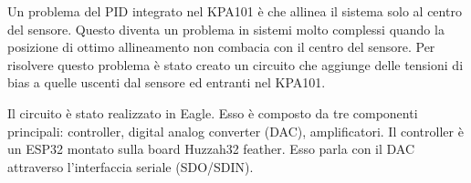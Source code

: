 Un problema del PID integrato nel KPA101 è che allinea il sistema solo al centro del sensore. Questo diventa un problema in sistemi molto complessi quando la posizione di ottimo allineamento non combacia con il centro del sensore. Per risolvere questo problema è stato creato un circuito che aggiunge delle tensioni di bias a quelle uscenti dal sensore ed entranti nel KPA101.

Il circuito è stato realizzato in Eagle. Esso è composto da tre componenti principali: controller, digital analog converter (DAC), amplificatori. Il controller è un ESP32 montato sulla board Huzzah32 feather. Esso parla con il DAC attraverso l'interfaccia seriale (SDO/SDIN).

